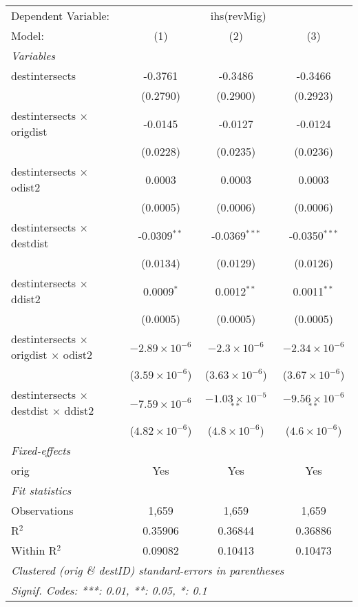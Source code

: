 \begin{tabular}{lccc}
\tabularnewline\midrule\midrule
Dependent Variable:&\multicolumn{3}{c}{ihs(revMig)}\\
Model:&(1) & (2) & (3)\\
\midrule \emph{Variables}&   &   &  \\
destintersects & -0.3761 & -0.3486 & -0.3466\\
  &(0.2790) & (0.2900) & (0.2923)\\
destintersects $\times $ origdist & -0.0145 & -0.0127 & -0.0124\\
  &(0.0228) & (0.0235) & (0.0236)\\
destintersects $\times $ odist2 & 0.0003 & 0.0003 & 0.0003\\
  &(0.0005) & (0.0006) & (0.0006)\\
destintersects $\times $ destdist & -0.0309$^{**}$ & -0.0369$^{***}$ & -0.0350$^{***}$\\
  &(0.0134) & (0.0129) & (0.0126)\\
destintersects $\times $ ddist2 & 0.0009$^{*}$ & 0.0012$^{**}$ & 0.0011$^{**}$\\
  &(0.0005) & (0.0005) & (0.0005)\\
destintersects $\times $ origdist $\times $ odist2 & $-2.89\times 10^{-6}$ & $-2.3\times 10^{-6}$ & $-2.34\times 10^{-6}$\\
  &($3.59\times 10^{-6}$) & ($3.63\times 10^{-6}$) & ($3.67\times 10^{-6}$)\\
destintersects $\times $ destdist $\times $ ddist2 & $-7.59\times 10^{-6}$ & $-1.03\times 10^{-5}$$^{**}$ & $-9.56\times 10^{-6}$$^{**}$\\
  &($4.82\times 10^{-6}$) & ($4.8\times 10^{-6}$) & ($4.6\times 10^{-6}$)\\
\midrule \emph{Fixed-effects}&   &   &  \\
orig & Yes & Yes & Yes\\
\midrule \emph{Fit statistics}&  & & \\
Observations & 1,659&1,659&1,659\\
R$^2$ & 0.35906&0.36844&0.36886\\
Within R$^2$ & 0.09082&0.10413&0.10473\\
\midrule\midrule\multicolumn{4}{l}{\emph{Clustered (orig \& destID) standard-errors in parentheses}}\\
\multicolumn{4}{l}{\emph{Signif. Codes: ***: 0.01, **: 0.05, *: 0.1}}\\
\end{tabular}


